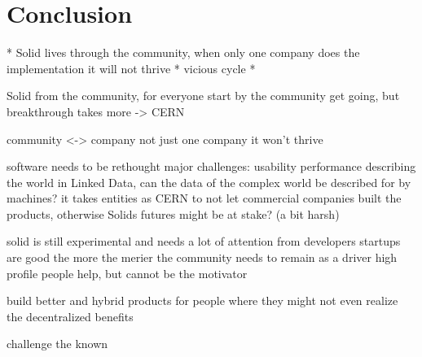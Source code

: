 \chapter{Conclusion}




* Solid lives through the community, when only one company does the implementation it will not thrive
* vicious cycle
* 

Solid from the community, for everyone
start by the community
get going, but breakthrough takes more -> CERN

community <-> company
not just one company it won't thrive

software needs to be rethought
major challenges:
    usability
    performance
    describing the world in Linked Data, can the data of the complex world be described for by machines?
it takes entities as CERN to not let commercial companies built the products, otherwise Solids futures might be at stake? (a bit harsh)

solid is still experimental and needs a lot of attention from developers
startups are good
the more the merier
the community needs to remain as a driver
high profile people help, but cannot be the motivator

build better and hybrid products for people where they might not even realize the decentralized benefits

challenge the known